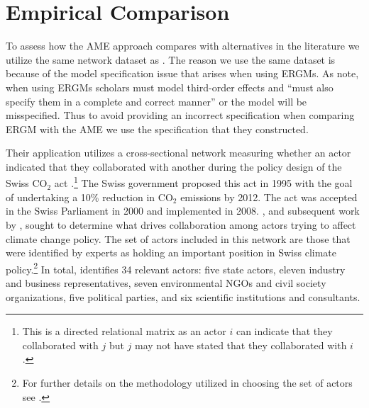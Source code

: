 \documentclass[12pt,onesided,pdflatex]{amsart}
\begin{document}
\section{\textbf{Empirical Comparison}} %

To assess how the AME approach compares with alternatives in the literature we utilize the same network dataset as \citet{cranmer:etal:2016}. The reason we use the same dataset is because of the model specification issue that arises when using ERGMs. As \citet[p. 8]{cranmer:etal:2016} note, when using ERGMs scholars must model third-order effects and ``must also specify them in a complete and correct manner'' or the model will be misspecified. Thus to avoid providing an incorrect specification when comparing ERGM with the AME we use the specification that they constructed. 

Their application utilizes a cross-sectional network measuring whether an actor indicated that they collaborated with another during the policy design of the Swiss CO$_{2}$ act \citep{ingold:2008}.\footnote{This is a directed relational matrix as an actor $i$ can indicate that they collaborated with $j$ but $j$ may not have stated that they collaborated with $i$.} The Swiss government proposed this act in 1995 with the goal of undertaking a 10\% reduction in CO$_{2}$ emissions by 2012. The act was accepted in the Swiss Parliament in 2000 and implemented in 2008. \citet{ingold:2008}, and subsequent work by \citet{ingold:fischer:2014}, sought to determine what drives collaboration among actors trying to affect climate change policy. The set of actors included in this network are those that were identified by experts as holding an important position in Swiss climate policy.\footnote{For further details on the methodology utilized in choosing the set of actors see \citet{ingold:2008,ingold:fischer:2014}.} In total, \citet{ingold:2008} identifies 34 relevant actors: five state actors, eleven industry and business representatives, seven environmental NGOs and civil society organizations, five political parties, and six scientific institutions and consultants. 
\end{document}
